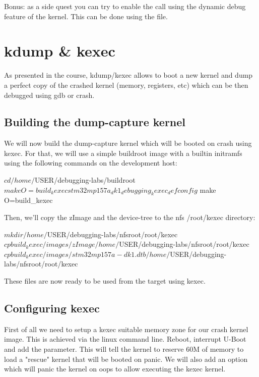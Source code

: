 Bonus: as a side quest you can try to enable the  call using
the dynamic debug feature of the kernel. This can be done using the
 file.

\section{kdump \& kexec}

As presented in the course, kdump/kexec allows to boot a new kernel and dump a
perfect copy of the crashed kernel (memory, registers, etc) which can be then
debugged using gdb or crash. 

\subsection{Building the dump-capture kernel}

We will now build the dump-capture kernel which will be booted on crash using
kexec. For that, we will use a simple buildroot image with a builtin initramfs
using the following commands on the development host:

\begin{bashinput}
$ cd /home/$USER/debugging-labs/buildroot
$ make O=build_kexec stm32mp157a_dk1_debugging_kexec_defconfig
$ make O=build_kexec
\end{bashinput}

Then, we'll copy the zImage and the device-tree to the nfs /root/kexec
directory:

\begin{bashinput}
$ mkdir /home/$USER/debugging-labs/nfsroot/root/kexec
$ cp build_kexec/images/zImage /home/$USER/debugging-labs/nfsroot/root/kexec
$ cp build_kexec/images/stm32mp157a-dk1.dtb /home/$USER/debugging-labs/nfsroot/root/kexec
\end{bashinput}

These files are now ready to be used from the target using kexec.

\subsection{Configuring kexec}

First of all we need to setup a kexec suitable memory zone for our crash kernel
image. This is achieved via the linux command line. Reboot, interrupt U-Boot and
add the  parameter. This will tell the kernel to reserve
60M of memory to load a "rescue" kernel that will be booted on panic. We will
also add an option which will panic the kernel on oops to allow executing the
kexec kernel.

